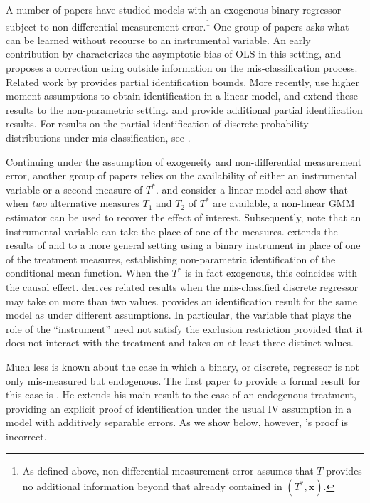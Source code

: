 A number of papers have studied models with an exogenous binary regressor subject to non-differential measurement error.\footnote{As defined above, non-differential measurement error assumes that $T$ provides no additional information beyond that already contained in $(T^*,\mathbf{x})$.}
One group of papers asks what can be learned without recourse to an instrumental variable.
An early contribution by \cite{Aigner} characterizes the asymptotic bias of OLS in this setting, and proposes a correction using outside information on the mis-classification process.
Related work by \cite{Bollinger} provides partial identification bounds.
More recently, \cite{ChenHuLewbel} use higher moment assumptions to obtain identification in a linear model, and \cite{ChenHuLewbel2} extend these results to the non-parametric setting. 
\cite{HasseltBollinger} and \cite{BollingerHasseltWP} provide additional partial identification results.
For results on the partial identification of discrete probability distributions under mis-classification, see \cite{molinari}.

Continuing under the assumption of exogeneity and non-differential measurement error, another group of papers relies on the availability of either an instrumental variable or a second measure of $T^*$.
\cite{BBS} and \cite{KRS} consider a linear model and show that when \emph{two} alternative measures $T_1$ and $T_2$ of $T^*$ are available, a non-linear GMM estimator can be used to recover the effect of interest.
Subsequently, \cite{FL} note that an instrumental variable can take the place of one of the measures.
\cite{Mahajan} extends the results of \cite{BBS} and \cite{KRS} to a more general setting using a binary instrument in place of one of the treatment measures, establishing non-parametric identification of the conditional mean function.
When the $T^*$ is in fact exogenous, this coincides with the causal effect.
\cite{hu2008} derives related results when the mis-classified discrete regressor may take on more than two values.
\cite{Lewbel} provides an identification result for the same model as \cite{Mahajan} under different assumptions.
In particular, the variable that plays the role of the ``instrument'' need not satisfy the exclusion restriction provided that it does not interact with the treatment and takes on at least three distinct values. 

Much less is known about the case in which a binary, or discrete, regressor is not only mis-measured but endogenous.
The first paper to provide a formal result for this case is \cite{Mahajan}.
He extends his main result to the case of an endogenous treatment, providing an explicit proof of identification under the usual IV assumption in a model with additively separable errors.
As we show below, however, \citeauthor{Mahajan}'s proof is incorrect.

